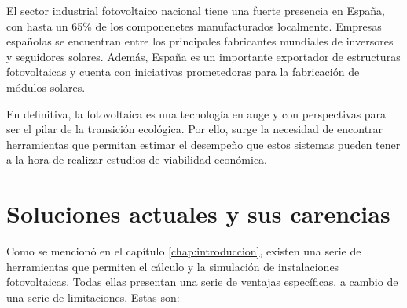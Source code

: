 El sector industrial fotovoltaico nacional tiene una fuerte presencia en España, con hasta un 65\% de los componenetes manufacturados localmente. Empresas españolas se encuentran entre los principales fabricantes mundiales de inversores y seguidores solares. Además, España es un importante exportador de estructuras fotovoltaicas y cuenta con iniciativas prometedoras para la fabricación de módulos solares.

En definitiva, la fotovoltaica es una tecnología en auge y con perspectivas para ser el pilar de la transición ecológica. Por ello, surge la necesidad de encontrar herramientas que permitan estimar el desempeño que estos sistemas pueden tener a la hora de realizar estudios de viabilidad económica.

\section{Soluciones actuales y sus carencias}
\label{sec:org294cd82}
Como se mencionó en el capítulo \ref{chap:introduccion}, existen una serie de herramientas que permiten el cálculo y la simulación de instalaciones fotovoltaicas. Todas ellas presentan una serie de ventajas específicas, a cambio de una serie de limitaciones. Estas son:
